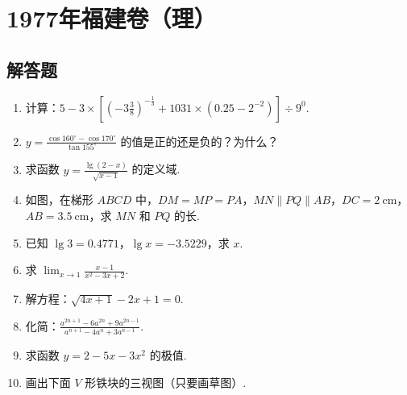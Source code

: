 \chapter{1977年福建卷（理）}

\section{解答题}

\begin{problem}
\begin{enumerate}
    \item 计算：\(5-3\times\left[\left(-3\frac{3}{8}\right)^{-\frac{1}{3}}+1031\times\left(0.25-2^{-2}\right)\right]\div9^0\).

    \item \(y=\frac{\cos160^\circ-\cos170^\circ}{\tan155^\circ}\) 的值是正的还是负的？为什么？

    \item 求函数 \(y=\frac{\lg\left(2-x\right)}{\sqrt{x-1}}\) 的定义域.

    \item 如图，在梯形 \(ABCD\) 中，\(DM=MP=PA\)，\(MN\parallel PQ\parallel AB\)，\(DC=2\mathrm{~cm}\)，\(AB=3.5\mathrm{~cm}\)，求 \(MN\) 和 \(PQ\) 的长.

    \item 已知 \(\lg3=0.4771\)，\(\lg x=-3.5229\)，求 \(x\).

    \item 求 \(\displaystyle\lim_{x\to1}\frac{x-1}{x^2-3x+2}\).

    \item 解方程：\(\sqrt{4x+1}-2x+1=0\).

    \item 化简：\(\frac{a^{2n+1}-6a^{2n}+9a^{2n-1}}{a^{n+1}-4a^n+3a^{n-1}}\).

    \item 求函数 \(y=2-5x-3x^2\) 的极值.

    \item 画出下面 \(V\) 形铁块的三视图（只要画草图）.
\end{enumerate}


\end{problem}

